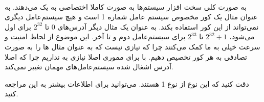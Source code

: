 \\
به صورت کلی سخت افزار سیستم‌ها به صورت کاملا اختصاصی به یک
می‌دهند. به عنوان مثال یک کور
مخصوص سیستم عامل شماره 1 است و هیچ سیستم‌عامل دیگری نمی‌تواند از این کور استفاده بکند.
به عنوان یک مثال دیگر آدرس‌های
$0$
تا
$2^{32}$
برای
اول می‌شود،
$2^{32}+1$
تا
$2^{33}$
برای سیستم‌عامل دوم و تا آخر.
این موضوع از لحاظ امنیت و سرعت خیلی به ما کمک می‌کنند چرا که نیازی نیست که به عنوان مثال
ها
را به صورت تصادفی به هر کور
تخصیص دهیم. با برای مموری اصلا نیازی به
نداریم چرا که اصلا آدرس اشغال شده سیستم‌عامل‌های مهمان تغییر نمی‌کند.

\noindent
دقت کنید که این نوع
از نوع 1 هستند.
می‌توانید برای اطلاعات بیشتر به این
مراجعه کنید.